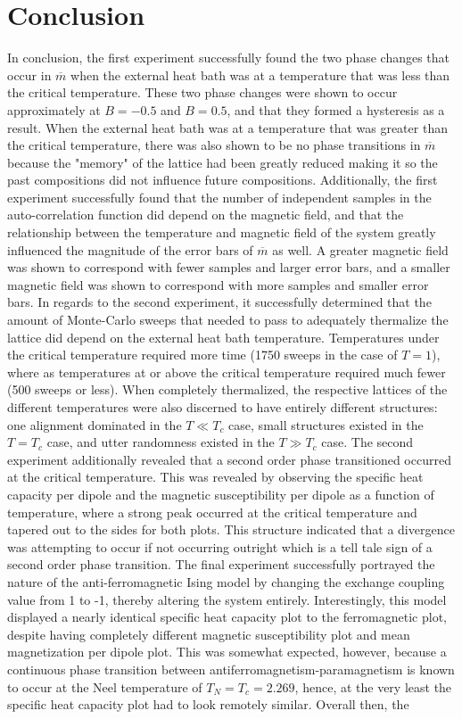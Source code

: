 \documentclass[twocolumn]{article}
\begin{document}
\section{Conclusion}
\hspace{\parindent} In conclusion, the first experiment successfully found the two phase changes that occur in $\overline{m}$ when the external heat bath was at a temperature that was less than the critical temperature. These two phase changes were shown to occur approximately at $B=-0.5$ and $B=0.5$, and that they formed a hysteresis as a result. When the external heat bath was at a temperature that was greater than the critical temperature, there was also shown to be no phase transitions in $\overline{m}$ because the "memory" of the lattice had been greatly reduced making it so the past compositions did not influence future compositions. Additionally, the first experiment successfully found that the number of independent samples in the auto-correlation function did depend on the magnetic field, and that the relationship between the temperature and magnetic field of the system greatly influenced the magnitude of the error bars of $\overline{m}$ as well. A greater magnetic field was shown to correspond with fewer samples and larger error bars, and a smaller magnetic field was shown to correspond with more samples and smaller error bars. In regards to the second experiment, it successfully determined that the amount of Monte-Carlo sweeps that needed to pass to adequately thermalize the lattice did depend on the external heat bath temperature. Temperatures under the critical temperature required more time (1750 sweeps in the case of $T=1$), where as temperatures at or above the critical temperature required much fewer (500 sweeps or less). When completely thermalized, the respective lattices of the different temperatures were also discerned to have entirely different structures: one alignment dominated in the $T \ll T_c$ case, small structures existed in the $T=T_c$ case, and utter randomness existed in the $T \gg T_c$ case. The second experiment additionally revealed that a second order phase transitioned occurred at the critical temperature. This was revealed by observing the specific heat capacity per dipole and the magnetic susceptibility per dipole as a function of temperature, where a strong peak occurred at the critical temperature and tapered out to the sides for both plots. This structure indicated that a divergence was attempting to occur if not occurring outright which is a tell tale sign of a second order phase transition. The final experiment successfully portrayed the nature of the anti-ferromagnetic Ising model by changing the exchange coupling value from 1 to -1, thereby altering the system entirely. Interestingly, this model displayed a nearly identical specific heat capacity plot to the ferromagnetic plot, despite having completely different magnetic susceptibility plot and mean magnetization per dipole plot. This was somewhat expected, however, because a continuous phase transition between antiferromagnetism-paramagnetism is known to occur at the Neel temperature of $T_N=T_c=2.269$, hence, at the very least the specific heat capacity plot had to look remotely similar. Overall then, the 
\end{document}
